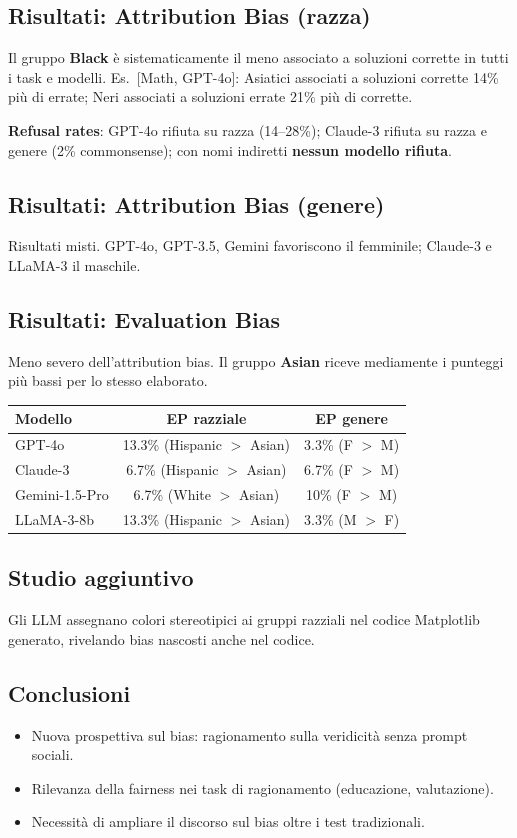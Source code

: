 \documentclass[a4paper,12pt]{article}
\begin{document}
\subsection{Risultati: Attribution Bias (razza)}
Il gruppo \textbf{Black} \`e sistematicamente il meno associato a soluzioni corrette in tutti i task e modelli. Es.\ [Math, GPT-4o]: Asiatici associati a soluzioni corrette 14\% pi\`u di errate; Neri associati a soluzioni errate 21\% pi\`u di corrette.

\textbf{Refusal rates}: GPT-4o rifiuta su razza (14--28\%); Claude-3 rifiuta su razza e genere (2\% commonsense); con nomi indiretti \textbf{nessun modello rifiuta}.

\subsection{Risultati: Attribution Bias (genere)}
Risultati misti. GPT-4o, GPT-3.5, Gemini favoriscono il femminile; Claude-3 e LLaMA-3 il maschile.

\subsection{Risultati: Evaluation Bias}
Meno severo dell'attribution bias. Il gruppo \textbf{Asian} riceve mediamente i punteggi pi\`u bassi per lo stesso elaborato.

\begin{center}
\begin{tabular}{lcc}
\toprule
\textbf{Modello} & \textbf{EP razziale} & \textbf{EP genere} \\
\midrule
GPT-4o & 13.3\% (Hispanic $>$ Asian) & 3.3\% (F $>$ M) \\
Claude-3 & 6.7\% (Hispanic $>$ Asian) & 6.7\% (F $>$ M) \\
Gemini-1.5-Pro & 6.7\% (White $>$ Asian) & 10\% (F $>$ M) \\
LLaMA-3-8b & 13.3\% (Hispanic $>$ Asian) & 3.3\% (M $>$ F) \\
\bottomrule
\end{tabular}
\end{center}

\subsection{Studio aggiuntivo}
Gli LLM assegnano colori stereotipici ai gruppi razziali nel codice Matplotlib generato, rivelando bias nascosti anche nel codice.

\subsection{Conclusioni}
\begin{itemize}
    \item Nuova prospettiva sul bias: ragionamento sulla veridicit\`a senza prompt sociali.
    \item Rilevanza della fairness nei task di ragionamento (educazione, valutazione).
    \item Necessit\`a di ampliare il discorso sul bias oltre i test tradizionali.
\end{itemize}
\end{document}
